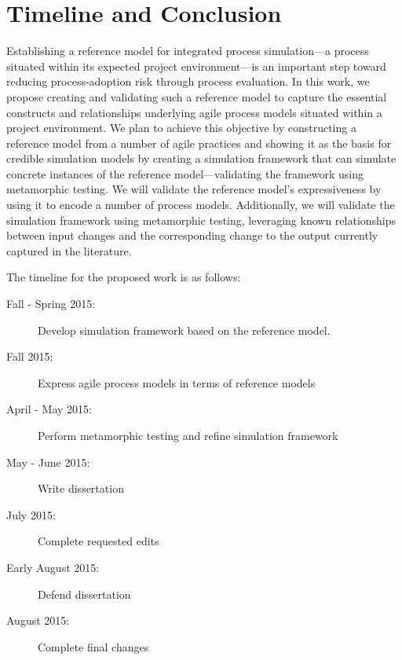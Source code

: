 \chapter{Timeline and Conclusion}
Establishing a reference model for integrated process simulation---a process
situated within its expected project environment---is an important step toward
reducing process-adoption risk through \apriori process evaluation.
In this work, we propose creating and validating such a reference model to
capture the essential constructs and relationships underlying agile process
models situated within a project environment.  
We plan to achieve this objective
by constructing a reference model from a number of agile practices and showing
it as the basis for credible simulation models by creating a simulation framework that can simulate concrete instances of the reference
model---validating the framework using metamorphic testing.  We will validate
the reference model's expressiveness by using it to encode a number of process
models.  Additionally, we will validate the simulation framework using
metamorphic testing, leveraging known relationships between input changes
and the corresponding change to the output currently captured in the literature.

% 
% 

The timeline for the proposed work is as follows:
\begin{description}
\item[Fall - Spring 2015:]  Develop simulation framework based on the reference
model.
\item[Fall 2015:]  Express agile process models in terms of reference models
\item[April - May 2015:]   Perform metamorphic testing and refine simulation
framework 
\item[May - June 2015:]  Write dissertation
\item[July 2015:]  Complete requested edits
\item[Early August 2015:]  Defend dissertation
\item[August 2015:]  Complete final changes
\end{description}

